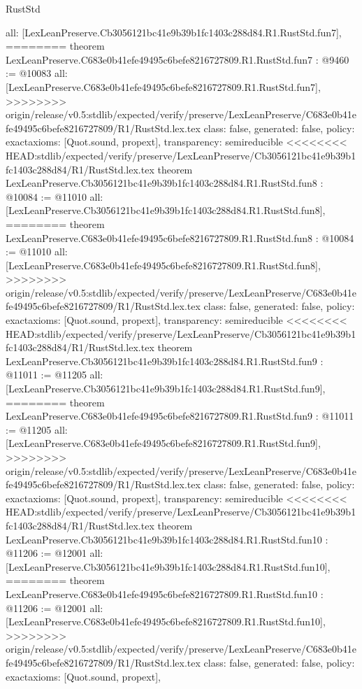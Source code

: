\begin{lexlean}{RustStd}
\begin{coremodule}
{\begin{coremodule}
{{{{{{{{{{  all: [LexLeanPreserve.Cb3056121bc41e9b39b1fc1403c288d84.R1.RustStd.fun7],
========
theorem LexLeanPreserve.C683e0b41efe49495c6befe8216727809.R1.RustStd.fun7 : @9460 := @10083 {
  all: [LexLeanPreserve.C683e0b41efe49495c6befe8216727809.R1.RustStd.fun7],
>>>>>>>> origin/release/v0.5:stdlib/expected/verify/preserve/LexLeanPreserve/C683e0b41efe49495c6befe8216727809/R1/RustStd.lex.tex
  class: false,
  generated: false,
  policy: exact{axioms: [Quot.sound, propext]},
  transparency: semireducible
}
<<<<<<<< HEAD:stdlib/expected/verify/preserve/LexLeanPreserve/Cb3056121bc41e9b39b1fc1403c288d84/R1/RustStd.lex.tex
theorem LexLeanPreserve.Cb3056121bc41e9b39b1fc1403c288d84.R1.RustStd.fun8 : @10084 := @11010 {
  all: [LexLeanPreserve.Cb3056121bc41e9b39b1fc1403c288d84.R1.RustStd.fun8],
========
theorem LexLeanPreserve.C683e0b41efe49495c6befe8216727809.R1.RustStd.fun8 : @10084 := @11010 {
  all: [LexLeanPreserve.C683e0b41efe49495c6befe8216727809.R1.RustStd.fun8],
>>>>>>>> origin/release/v0.5:stdlib/expected/verify/preserve/LexLeanPreserve/C683e0b41efe49495c6befe8216727809/R1/RustStd.lex.tex
  class: false,
  generated: false,
  policy: exact{axioms: [Quot.sound, propext]},
  transparency: semireducible
}
<<<<<<<< HEAD:stdlib/expected/verify/preserve/LexLeanPreserve/Cb3056121bc41e9b39b1fc1403c288d84/R1/RustStd.lex.tex
theorem LexLeanPreserve.Cb3056121bc41e9b39b1fc1403c288d84.R1.RustStd.fun9 : @11011 := @11205 {
  all: [LexLeanPreserve.Cb3056121bc41e9b39b1fc1403c288d84.R1.RustStd.fun9],
========
theorem LexLeanPreserve.C683e0b41efe49495c6befe8216727809.R1.RustStd.fun9 : @11011 := @11205 {
  all: [LexLeanPreserve.C683e0b41efe49495c6befe8216727809.R1.RustStd.fun9],
>>>>>>>> origin/release/v0.5:stdlib/expected/verify/preserve/LexLeanPreserve/C683e0b41efe49495c6befe8216727809/R1/RustStd.lex.tex
  class: false,
  generated: false,
  policy: exact{axioms: [Quot.sound, propext]},
  transparency: semireducible
}
<<<<<<<< HEAD:stdlib/expected/verify/preserve/LexLeanPreserve/Cb3056121bc41e9b39b1fc1403c288d84/R1/RustStd.lex.tex
theorem LexLeanPreserve.Cb3056121bc41e9b39b1fc1403c288d84.R1.RustStd.fun10 : @11206 := @12001 {
  all: [LexLeanPreserve.Cb3056121bc41e9b39b1fc1403c288d84.R1.RustStd.fun10],
========
theorem LexLeanPreserve.C683e0b41efe49495c6befe8216727809.R1.RustStd.fun10 : @11206 := @12001 {
  all: [LexLeanPreserve.C683e0b41efe49495c6befe8216727809.R1.RustStd.fun10],
>>>>>>>> origin/release/v0.5:stdlib/expected/verify/preserve/LexLeanPreserve/C683e0b41efe49495c6befe8216727809/R1/RustStd.lex.tex
  class: false,
  generated: false,
  policy: exact{axioms: [Quot.sound, propext]},
}}}}}}}}}}}}}}
\end{coremodule}}
\end{coremodule}
\end{lexlean}

